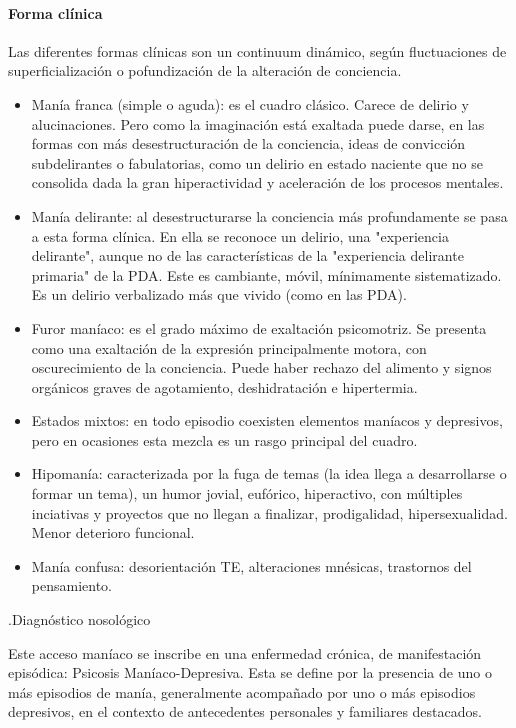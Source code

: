 \paragraph{Forma clínica}
Las diferentes formas clínicas son un continuum dinámico, según fluctuaciones de superficialización o pofundización de la alteración de conciencia.
\begin{itemize}
	\item Manía franca (simple o aguda): es el cuadro clásico. Carece de delirio y alucinaciones. Pero como la imaginación está exaltada puede darse, en las formas con más desestructuración de la conciencia, ideas de convicción subdelirantes o fabulatorias, como un delirio en estado naciente que no se consolida dada la gran hiperactividad y aceleración de los procesos mentales.
	\item Manía delirante: al desestructurarse la conciencia más profundamente se pasa a esta forma clínica. En ella se reconoce un delirio, una "experiencia delirante", aunque no de las características de la "experiencia delirante primaria" de la PDA. Este es cambiante, móvil, mínimamente sistematizado. Es un delirio verbalizado más que vivido (como en las PDA).
	\item Furor maníaco: es el grado máximo de exaltación psicomotriz. Se presenta como una exaltación de la expresión principalmente motora, con oscurecimiento de la conciencia. Puede haber rechazo del alimento y signos orgánicos graves de agotamiento, deshidratación e hipertermia.
	\item Estados mixtos: en todo episodio coexisten elementos maníacos y depresivos, pero en ocasiones esta mezcla es un rasgo principal del cuadro.
	\item Hipomanía: caracterizada por la fuga de temas (la idea llega a desarrollarse o formar un tema), un humor jovial, eufórico, hiperactivo, con múltiples inciativas y proyectos que no llegan a finalizar, prodigalidad, hipersexualidad. Menor deterioro funcional.
	\item Manía confusa: desorientación TE, alteraciones mnésicas, trastornos del pensamiento.
\end{itemize}

.Diagnóstico nosológico

Este acceso maníaco se inscribe en una enfermedad crónica, de manifestación episódica: Psicosis Maníaco-Depresiva. Esta se define por la presencia de uno o más episodios de manía, generalmente acompañado por uno o más episodios depresivos, en el contexto de antecedentes personales y familiares destacados.

